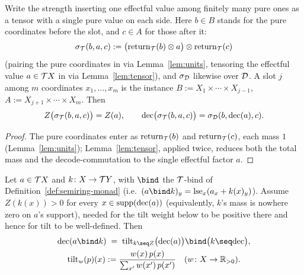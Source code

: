 \begin{lemma}[Strengths]
\label{lem:strengths}
\leanok
Write the strength inserting one effectful value among finitely many pure
ones as a tensor with a single pure value on each side. Here $b \in B$
stands for the pure coordinates before the slot, and $c \in A$ for those
after it:
\[
  \sigma_{\mathcal T}(b,a,c) := \bigl(\mathrm{return}_{\mathcal T}(b) \otimes a\bigr) \otimes
  \mathrm{return}_{\mathcal T}(c)
\]
(pairing the pure coordinates in via Lemma~\ref{lem:units}, tensoring the
effectful value $a \in \mathcal T X$ in via Lemma~\ref{lem:tensor}), and
$\sigma_{\mathcal D}$ likewise over $\mathcal D$. A slot $j$ among $m$ coordinates
$x_1,\ldots,x_m$ is the instance $B := X_1\times\cdots\times X_{j-1}$,
$A := X_{j+1}\times\cdots\times X_m$. Then
\[
  Z\bigl(\sigma_{\mathcal T}(b,a,c)\bigr) = Z(a), \qquad
  \mathrm{dec}\bigl(\sigma_{\mathcal T}(b,a,c)\bigr) = \sigma_{\mathcal D}(b,\mathrm{dec}(a),c).
\]
\end{lemma}

\begin{proof}
\leanok
The pure coordinates enter as $\mathrm{return}_{\mathcal T}(b)$ and $\mathrm{return}_{\mathcal T}(c)$, each
mass $1$ (Lemma~\ref{lem:units}); Lemma~\ref{lem:tensor}, applied twice,
reduces both the total mass and the decode-commutation to the single
effectful factor $a$.
\end{proof}

\begin{lemma}[Tilt]
\label{lem:tilt}
\leanok
Let $a \in \mathcal T X$ and $k \colon X \to \mathcal T Y$, with $\bind$ the
$\mathcal T$-bind of Definition~\ref{def:semiring-monad} (i.e.\
$(a \bind k)_y = \lse_x(a_x+k(x)_y)$). Assume $Z(k(x)) > 0$ for every
$x \in \operatorname{supp}(\mathrm{dec}(a))$ (equivalently, $k$'s mass is nowhere zero on
$a$'s support), needed for the tilt weight below to be positive there
and hence for $\mathrm{tilt}$ to be well-defined. Then
\begin{gather*}
  \dec(a \bind k) \;=\; \tilt_{k \seq Z}\bigl(\dec(a)\bigr) \bind
  \bigl(k \seq \dec\bigr), \\
  \tilt_w(p)(x) := \frac{w(x)\,p(x)}{\sum_{x'} w(x')\,p(x')}
  \quad (w \colon X \to \mathbb R_{>0}).
\end{gather*}
\end{lemma}

